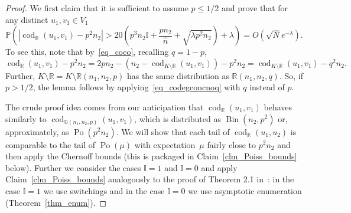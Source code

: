 \documentclass[12pt,reqno]{amsart}
\newcommand{\Prob} {\mathbb {P}}
\newcommand{\prob}[1]{\Prob\left(#1\right)}
\newcommand{\R} {\mathbb R}
\newcommand{\Rnnp}{\R(n_1,n_2,p)}
\newcommand{\G} {\mathbb G}
\newcommand{\Gnnp} {\G(n_1,n_2,p)}
\newcommand{\I} {\mathbb I}
\newcommand{\Bi}{\operatorname{Bin}}
\newcommand{\Po}{\operatorname{Po}}
\newcommand{\cod}{\operatorname{cod}}
\theoremstyle{definition}
\begin{document}
\begin{proof}
We first claim that it is sufficient to assume $p \le 1/2$ and prove
that for any distinct $u_1, v_1 \in V_1$
\begin{equation}
  \label{eq_codegconcnoq}
  \prob{ |\cod_{\R}(u_1,v_1) - p^2n_2| > 20\left(p^3n_2\I + \frac{pn_2}{\hat n} + \sqrt{\lambda p^2n_2 } \right) + \lambda } = O\left( \sqrt N e^{ - \lambda } \right).
\end{equation}
	To see this, note that by~\eqref{eq_coco}, recalling $q = 1 - p$,
	\begin{equation*}
		\cod_{\R}(u_1, v_1) - p^2n_2= 2pn_2 - (n_2 - \cod_{K \setminus \R}(u_1,v_1))- p^2n_2=\cod_{K \setminus \R}(u_1,v_1) - q^2n_2.
	\end{equation*}
	Further, $K \setminus \R = K \setminus \Rnnp$ has the same distribution as $\R(n_1,n_2,q)$. So, if $p > 1/2$, the lemma follows by applying~\eqref{eq_codegconcnoq} with $q$ instead of $p$.
	
	
	The crude proof idea comes from our anticipation that $\cod_\R(u_1,v_1)$ behaves similarly to $\cod_{\Gnnp}(u_1,v_1)$, which is distributed as $\Bi(n_2, p^2)$ or, approximately, as $\Po(p^2n_2)$. We will show that each tail of $\cod_\R(u_1,u_2)$ is comparable to the tail of $\Po(\mu)$ with expectation~$\mu$ fairly close to $p^2n_2$ and then apply the Chernoff bounds (this is packaged in Claim~\ref{clm_Poiss_bounds} below). Further we consider the cases $\I = 1$ and $\I = 0$ and apply Claim~\ref{clm_Poiss_bounds} analogously to the proof of Theorem 2.1 in~\cite{KSVW}: in the case $\I = 1$ we use switchings and in the case $\I = 0$ we use asymptotic enumeration (Theorem~\ref{thm_enum}).


\end{proof}
\end{document}
